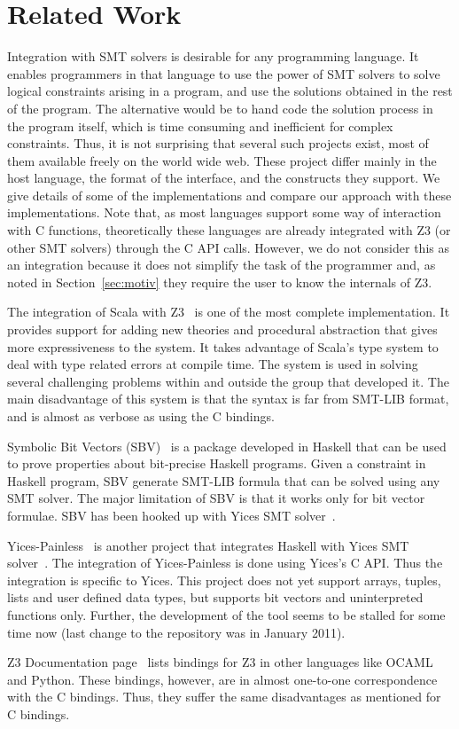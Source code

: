 \section{Related Work}
Integration with SMT solvers is desirable for any programming
language. It enables programmers in that language to use the
power of SMT solvers to solve logical constraints arising in
a program, and use the solutions obtained in the rest of the
program. The alternative would be to hand code the solution
process in the program itself, which is time consuming and
inefficient for complex constraints. Thus, it is not
surprising that several such projects exist, most of them
available freely on the world wide web. These project differ
mainly in the host language, the format of the interface, and
the constructs they support.  We give details of some of the
implementations and compare our approach with these
implementations.  Note that, as most languages support some
way of interaction with C functions, theoretically these
languages are already integrated with Z3 (or other SMT
solvers) through the C API calls. However, we do not consider
this as an integration because it does not simplify the task
of the programmer and, as noted in Section~\ref{sec:motiv} they
require the user to know the internals of Z3. 


The integration of Scala with Z3~\cite{scalaz3} is one of the
most complete implementation. It provides support for adding
new theories and procedural abstraction that gives more
expressiveness to the system. It takes advantage of Scala's
type system to deal with type related errors at compile time.
The system is used in solving several challenging problems
within and outside the group that developed it. The main
disadvantage of this system is that the syntax is far from
SMT-LIB format, and is almost as verbose as using the C bindings.

Symbolic Bit Vectors (SBV)~\cite{sbv} is a package developed
in Haskell that can be used to prove properties about
bit-precise Haskell programs. Given a constraint in Haskell
program, SBV generate SMT-LIB formula that can be solved
using any SMT solver.  The major limitation of SBV is that it
works only for bit vector formulae. SBV has been hooked up
with Yices SMT solver~\cite{yices}.

Yices-Painless~\cite{yices-painless} is another project that
integrates Haskell with Yices SMT solver~\cite{yices}.  The
integration of Yices-Painless is done using Yices's C
API. Thus the integration is specific to Yices.  This project
does not yet support arrays, tuples, lists and user defined
data types, but supports bit vectors and uninterpreted
functions only. Further, the development of the tool seems to
be stalled for some time now (last change to the repository
was in January 2011).

Z3 Documentation page~\cite{z3} lists bindings for Z3
in other languages like OCAML and Python. These bindings,
however, are in almost one-to-one correspondence with the C
bindings. Thus, they suffer the same disadvantages as
mentioned for C bindings.
